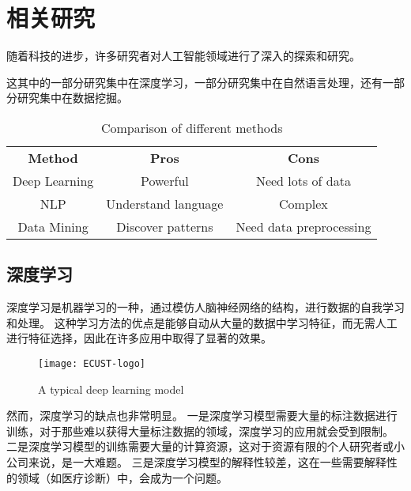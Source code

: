 

\section{相关研究}\label{sec:related-work}
随着科技的进步，许多研究者对人工智能领域进行了深入的探索和研究\cite{smith2020}。\par
这其中的一部分研究集中在深度学习\cite{brown2021}，一部分研究集中在自然语言处理\cite{jones2021}，还有一部分研究集中在数据挖掘\cite{thomas2020}。\par
\begin{table}[ht]
    \centering
    \begin{tabular}{ccc}
        \Xhline{1pt}
        \textbf{Method} & \textbf{Pros}       & \textbf{Cons}           \\
        \Xhline{1pt}
        Deep Learning   & Powerful            & Need lots of data       \\
        \hline
        NLP             & Understand language & Complex                 \\
        \hline
        Data Mining     & Discover patterns   & Need data preprocessing \\
        \hline
    \end{tabular}
    \caption{Comparison of different methods}
    \label{tab:comparison}
\end{table}

\subsection{深度学习}\label{subsec:deep-learning}
深度学习是机器学习的一种，通过模仿人脑神经网络的结构，进行数据的自我学习和处理。
这种学习方法的优点是能够自动从大量的数据中学习特征，而无需人工进行特征选择，因此在许多应用中取得了显著的效果。\par
\begin{figure}[ht]
    \centering
    \texttt{[image: ECUST-logo]}
    \caption{A typical deep learning model}
    \label{fig:deep-learning-model}
\end{figure}

然而，深度学习的缺点也非常明显。
一是深度学习模型需要大量的标注数据进行训练，对于那些难以获得大量标注数据的领域，深度学习的应用就会受到限制。
二是深度学习模型的训练需要大量的计算资源，这对于资源有限的个人研究者或小公司来说，是一大难题。
三是深度学习模型的解释性较差，这在一些需要解释性的领域（如医疗诊断）中，会成为一个问题。\par

